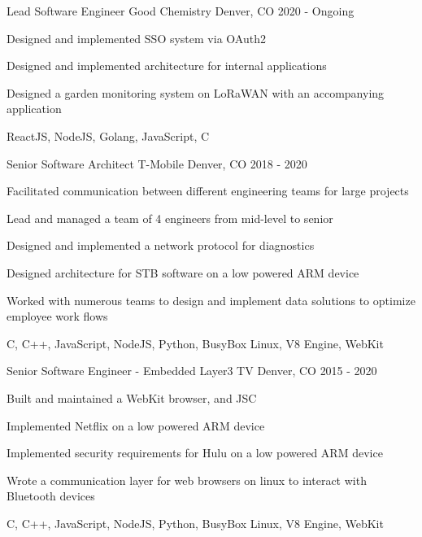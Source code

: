 \begin{cventries}
  \cventry
    {Lead Software Engineer}
    {Good Chemistry}
    {Denver, CO}
    {2020 - Ongoing}
    {
      \begin{cvitems}
        \item {Designed and implemented SSO system via OAuth2}
        \item {Designed and implemented architecture for internal applications}
        \item {Designed a garden monitoring system on LoRaWAN with an accompanying application}
        \item {ReactJS, NodeJS, Golang, JavaScript, C}
      \end{cvitems}
    }
  \cventry
    {Senior Software Architect}
    {T-Mobile}
    {Denver, CO}
    {2018 - 2020}
    {
      \begin{cvitems}
        \item {Facilitated communication between different engineering teams for large projects}
        \item {Lead and managed a team of 4 engineers from mid-level to senior}
        \item {Designed and implemented a network protocol for diagnostics}
        \item {Designed architecture for STB software on a low powered ARM device}
        \item {Worked with numerous teams to design and implement data solutions to optimize employee work flows}
        \item {C, C++, JavaScript, NodeJS, Python, BusyBox Linux, V8 Engine, WebKit}
      \end{cvitems}
    }
  \cventry
    {Senior Software Engineer - Embedded}
    {Layer3 TV}
    {Denver, CO}
    {2015 - 2020}
    {
      \begin{cvitems}
        \item {Built and maintained a WebKit browser, and JSC}
        \item {Implemented Netflix on a low powered ARM device}
        \item {Implemented security requirements for Hulu on a low powered ARM device}
        \item {Wrote a communication layer for web browsers on linux to interact with Bluetooth devices}
        \item {C, C++, JavaScript, NodeJS, Python, BusyBox Linux, V8 Engine, WebKit}
      \end{cvitems}
}
\end{cventries}
